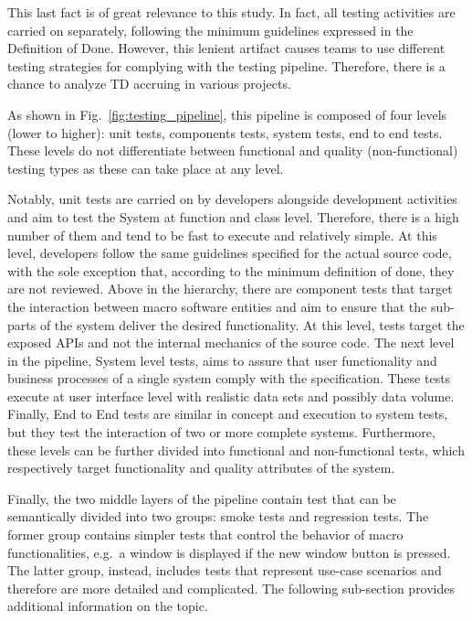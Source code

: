 This last fact is of great relevance to this study. In fact, all testing activities are carried on separately, following the minimum guidelines expressed in the Definition of Done. However, this lenient artifact causes teams to use different testing strategies for complying with the testing pipeline. Therefore, there is a chance to analyze TD accruing in various projects.

As shown in Fig.\ \ref{fig:testing_pipeline}, this pipeline is composed of four levels (lower to higher): unit tests, components tests, system tests, end to end tests. These levels do not differentiate between functional and quality (non-functional) testing types as these can take place at any level.

Notably, unit tests are carried on by developers alongside development activities and aim to test the System at function and class level. Therefore, there is a high number of them and tend to be fast to execute and relatively simple. At this level, developers follow the same guidelines specified for the actual source code, with the sole exception that, according to the minimum definition of done, they are not reviewed. Above in the hierarchy, there are component tests that target the interaction between macro software entities and aim to ensure that the sub-parts of the system deliver the desired functionality. At this level, tests target the exposed APIs and not the internal mechanics of the source code. The next level in the pipeline, System level tests, aims to assure that user functionality and business processes of a single system comply with the specification. These tests execute at user interface level with realistic data sets and possibly data volume. Finally, End to End tests are similar in concept and execution to system tests, but they test the interaction of two or more complete systems. Furthermore, these levels can be further divided into functional and non-functional tests, which respectively target functionality and quality attributes of the system.

Finally, the two middle layers of the pipeline contain test that can be semantically divided into two groups: smoke tests and regression tests. The former group contains simpler tests that control the behavior of macro functionalities, e.g.\ a window is displayed if the new window button is pressed. The latter group, instead, includes tests that represent use-case scenarios and therefore are more detailed and complicated. The following sub-section provides additional information on the topic.

